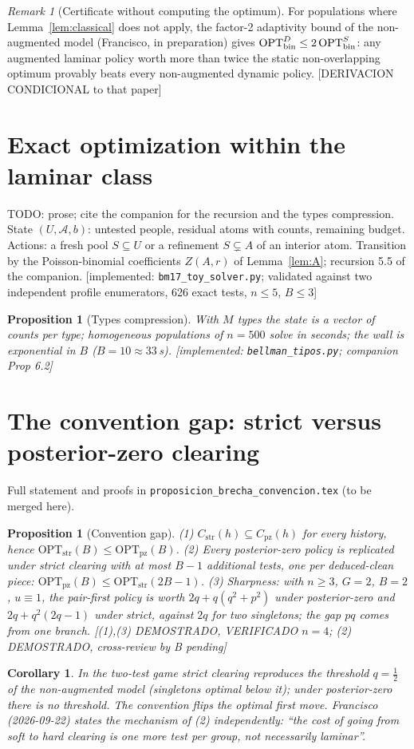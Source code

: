 \documentclass[11pt]{article}
\newtheorem{proposition}[theorem]{Proposition}
\newtheorem{corollary}[theorem]{Corollary}
\theoremstyle{remark}
\newtheorem{remark}[theorem]{Remark}
\newcommand{\status}[1]{\textcolor{blue!60!black}{\textsf{\small [#1]}}}
\newcommand{\todo}[1]{\textcolor{red!70!black}{\textsf{\small TODO: #1}}}
\newcommand{\OPT}{\mathrm{OPT}}
\newcommand{\pz}{\mathrm{pz}}
\newcommand{\str}{\mathrm{str}}
\begin{document}
\begin{remark}[Certificate without computing the optimum]
For populations where Lemma~\ref{lem:classical} does not apply, the factor-2 adaptivity bound of the non-augmented model (Francisco, in preparation) gives $\OPT^{D}_{\rm bin}\le 2\,\OPT^{S}_{\rm bin}$: any augmented laminar policy worth more than twice the static non-overlapping optimum provably beats every non-augmented dynamic policy. \status{DERIVACION CONDICIONAL to that paper}
\end{remark}

\section{Exact optimization within the laminar class}\label{sec:exact}
\todo{prose; cite the companion for the recursion and the types compression.}
State $(U,\mathcal A,b)$: untested people, residual atoms with counts, remaining budget. Actions: a fresh pool $S\subseteq U$ or a refinement $S\subsetneq A$ of an interior atom. Transition by the Poisson-binomial coefficients $Z(A,r)$ of Lemma~\ref{lem:A}; recursion 5.5 of the companion. \status{implemented: \texttt{bm17\_toy\_solver.py}; validated against two independent profile enumerators, 626 exact tests, $n\le5$, $B\le3$}
\begin{proposition}[Types compression]
With $M$ types the state is a vector of counts per type; homogeneous populations of $n=500$ solve in seconds; the wall is exponential in $B$ ($B=10\approx33$\,s). \status{implemented: \texttt{bellman\_tipos.py}; companion Prop 6.2}
\end{proposition}

\section{The convention gap: strict versus posterior-zero clearing}\label{sec:gap}
Full statement and proofs in \texttt{proposicion\_brecha\_convencion.tex} (to be merged here).
\begin{proposition}[Convention gap]
(1) $C_{\str}(h)\subseteq C_{\pz}(h)$ for every history, hence $\OPT_{\str}(B)\le\OPT_{\pz}(B)$. (2) Every posterior-zero policy is replicated under strict clearing with at most $B-1$ additional tests, one per deduced-clean piece: $\OPT_{\pz}(B)\le\OPT_{\str}(2B-1)$. (3) Sharpness: with $n\ge3$, $G=2$, $B=2$, $u\equiv1$, the pair-first policy is worth $2q+q(q^2+p^2)$ under posterior-zero and $2q+q^2(2q-1)$ under strict, against $2q$ for two singletons; the gap $pq$ comes from one branch. \status{(1),(3) DEMOSTRADO, VERIFICADO $n=4$; (2) DEMOSTRADO, cross-review by B pending}
\end{proposition}
\begin{corollary}
In the two-test game strict clearing reproduces the threshold $q=\tfrac12$ of the non-augmented model (singletons optimal below it); under posterior-zero there is no threshold. The convention flips the optimal first move. Francisco (2026-09-22) states the mechanism of (2) independently: ``the cost of going from soft to hard clearing is one more test per group, not necessarily laminar''.
\end{corollary}
\end{document}
